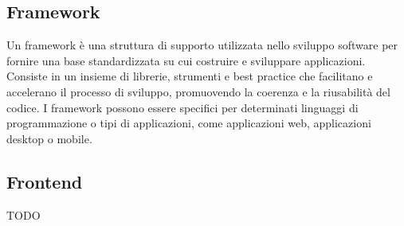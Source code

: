 \subsection*{Framework}
Un framework è una struttura di supporto utilizzata nello sviluppo software per fornire una base standardizzata su cui costruire e sviluppare applicazioni. Consiste in un insieme di librerie, strumenti e best practice che facilitano e accelerano il processo di sviluppo, promuovendo la coerenza e la riusabilità del codice. I framework possono essere specifici per determinati linguaggi di programmazione o tipi di applicazioni, come applicazioni web, applicazioni desktop o mobile.

\vspace{2em}
\subsection*{Frontend}
TODO
